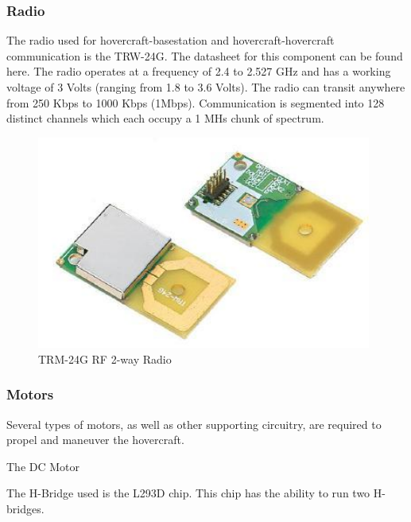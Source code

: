 \subsubsection{Radio}
The radio used for hovercraft-basestation and hovercraft-hovercraft communication is the TRW-24G.  The datasheet for this component can be found here.  The radio operates at a frequency of 2.4 to 2.527 GHz and has a working voltage of 3 Volts (ranging from 1.8 to 3.6 Volts).  The radio can transit anywhere from 250 Kbps to 1000 Kbps (1Mbps).  Communication is segmented into 128 distinct channels which each occupy a 1 MHs chunk of spectrum. 

\begin{figure}[h]
  \begin{center}
    \includegraphics[width=110mm]{imageSources/radio.png}
  \end{center}
  \caption{TRM-24G RF 2-way Radio} 
  \label{radioFig}
\end{figure}

\subsubsection{Motors}
Several types of motors, as well as other supporting circuitry, are required to propel and maneuver the hovercraft.  

The DC Motor

The H-Bridge used is the L293D chip. This chip has the ability to run two H-bridges. 

